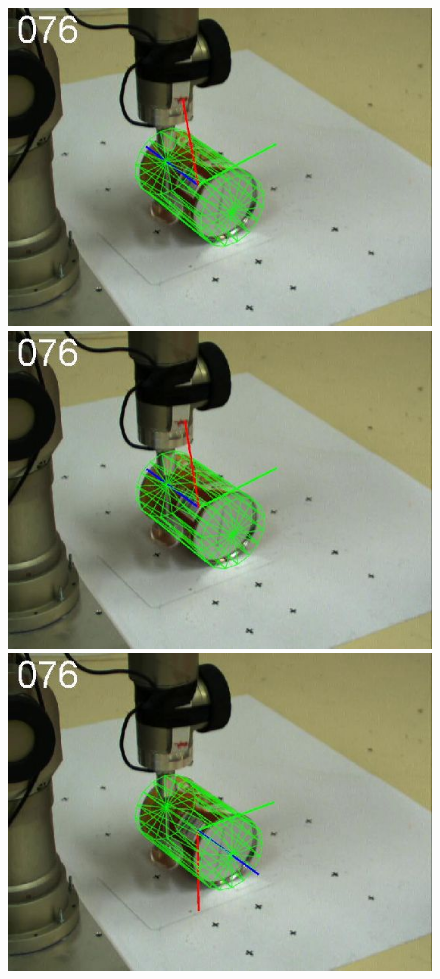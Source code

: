 \begin{figure}[htbp]
{\includegraphics[width=\imgAXwid]{images/A3_2exp_39_1}
\includegraphics[width=\imgAXwid]{images/A3_LWPR1_39_1}
\includegraphics[width=\imgAXwid]{images/A3_physx_39_1}
}
\end{figure}
